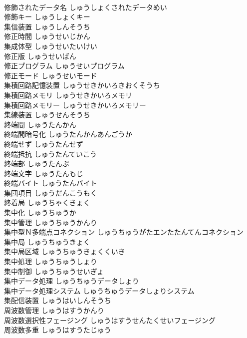 \documentclass[8pt]{extreport}
\begin{document}
\begin{CJK}{UTF8}{min}
\\	修飾されたデータ名	しゅうしょくされたデータめい	
\\	修飾キー	しゅうしょくキー	
\\	集信装置	しゅうしんそうち	
\\	修正時間	しゅうせいじかん	
\\	集成体型	しゅうせいたいけい	
\\	修正版	しゅうせいばん	
\\	修正プログラム	しゅうせいプログラム	
\\	修正モード	しゅうせいモード	
\\	集積回路記憶装置	しゅうせきかいろきおくそうち	
\\	集積回路メモリ	しゅうせきかいろメモリ	
\\	集積回路メモリー	しゅうせきかいろメモリー	
\\	集線装置	しゅうせんそうち	
\\	終端間	しゅうたんかん	
\\	終端間暗号化	しゅうたんかんあんごうか	
\\	終端せず	しゅうたんせず	
\\	終端抵抗	しゅうたんていこう	
\\	終端部	しゅうたんぶ	
\\	終端文字	しゅうたんもじ	
\\	終端バイト	しゅうたんバイト	
\\	集団項目	しゅうだんこうもく	
\\	終着局	しゅうちゃくきょく	
\\	集中化	しゅうちゅうか	
\\	集中管理	しゅうちゅうかんり	
\\	集中型Ｎ多端点コネクション	しゅうちゅうがたエンたたんてんコネクション	
\\	集中局	しゅうちゅうきょく	
\\	集中局区域	しゅうちゅうきょくくいき	
\\	集中処理	しゅうちゅうしょり	
\\	集中制御	しゅうちゅうせいぎょ	
\\	集中データ処理	しゅうちゅうデータしょり	
\\	集中データ処理システム	しゅうちゅうデータしょりシステム	
\\	集配信装置	しゅうはいしんそうち	
\\	周波数管理	しゅうはすうかんり	
\\	周波数選択性フェージング	しゅうはすうせんたくせいフェージング	
\\	周波数多重	しゅうはすうたじゅう	

\end{CJK}
\end{document}
